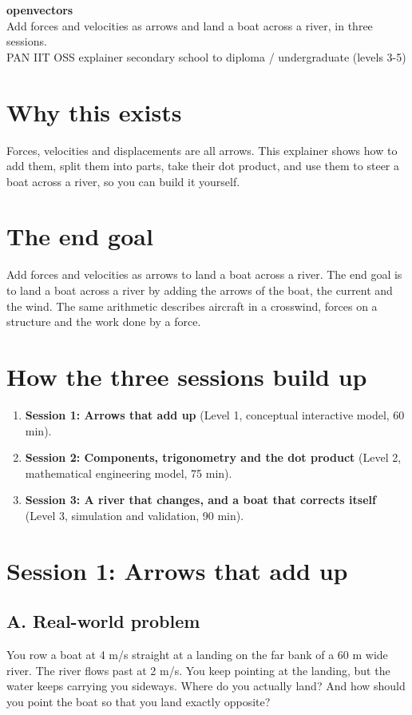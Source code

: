 \documentclass[11pt,a4paper]{article}
\begin{document}
\begin{center}{\LARGE\bfseries openvectors}\\[0.4em]{\large Add forces and velocities as arrows and land a boat across a river, in three sessions.}\\[0.2em]\small PAN IIT OSS explainer \textbullet{} secondary school to diploma / undergraduate (levels 3-5)\end{center}

\section*{Why this exists}
Forces, velocities and displacements are all arrows. This explainer shows how to add them, split them into parts, take their dot product, and use them to steer a boat across a river, so you can build it yourself.

\section*{The end goal}
Add forces and velocities as arrows to land a boat across a river. The end goal is to land a boat across a river by adding the arrows of the boat, the current and the wind. The same arithmetic describes aircraft in a crosswind, forces on a structure and the work done by a force.

\section*{How the three sessions build up}
\begin{enumerate}[nosep]
\item \textbf{Session 1: Arrows that add up} (Level 1, conceptual interactive model, 60 min).
\item \textbf{Session 2: Components, trigonometry and the dot product} (Level 2, mathematical engineering model, 75 min).
\item \textbf{Session 3: A river that changes, and a boat that corrects itself} (Level 3, simulation and validation, 90 min).
\end{enumerate}

\section{Session 1: Arrows that add up}

\subsection*{A. Real-world problem}
You row a boat at 4 m/s straight at a landing on the far bank of a 60 m wide river. The river flows past at 2 m/s. You keep pointing at the landing, but the water keeps carrying you sideways. Where do you actually land? And how should you point the boat so that you land exactly opposite?
\end{document}
